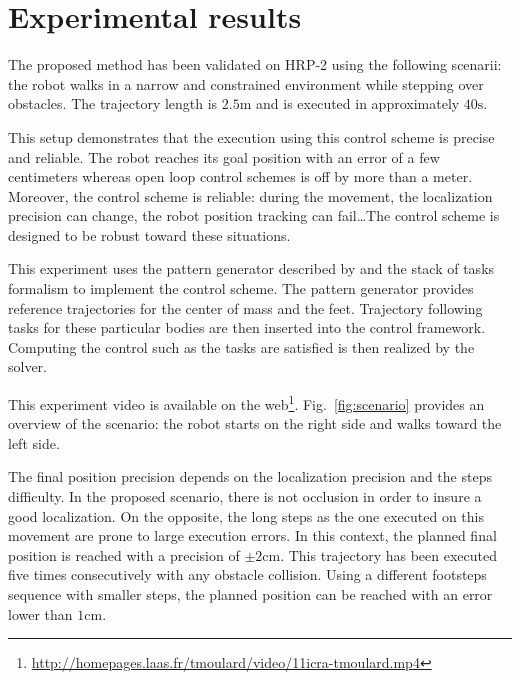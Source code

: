 \section{Experimental results}
\label{exp}


The proposed method has been validated on HRP-2 using the following
scenarii: the robot walks in a narrow and constrained environment
while stepping over obstacles. The trajectory length is
$2.5\mathrm{m}$ and is executed in approximately $40\mathrm{s}$.


This setup demonstrates that the execution using this control scheme
is precise and reliable. The robot reaches its goal position with an
error of a few centimeters whereas open loop control schemes is off by
more than a meter. Moreover, the control scheme is reliable: during
the movement, the localization precision can change, the robot
position tracking can fail\ldots The control scheme is designed to be
robust toward these situations.


This experiment uses the pattern generator described by
\cite{10icra.perrin} and the stack of tasks formalism
\cite{09icar.mansard} to implement the control scheme. The pattern
generator provides reference trajectories for the center of mass and
the feet. Trajectory following tasks for these particular bodies are
then inserted into the control framework. Computing the control such
as the tasks are satisfied is then realized by the solver.


This experiment video is available on the
web\footnote{\mbox{\url{http://homepages.laas.fr/tmoulard/video/11icra-tmoulard.mp4}}}. Fig.~\ref{fig:scenario}
provides an overview of the scenario: the robot starts on the right
side and walks toward the left side.


The final position precision depends on the localization precision and
the steps difficulty. In the proposed scenario, there is not occlusion
in order to insure a good localization. On the opposite, the long
steps as the one executed on this movement are prone to large
execution errors. In this context, the planned final position is
reached with a precision of $\pm 2 \mathrm{cm}$. This trajectory has
been executed five times consecutively with any obstacle collision.
Using a different footsteps sequence with smaller steps, the planned
position can be reached with an error lower than $1 \mathrm{cm}$.


